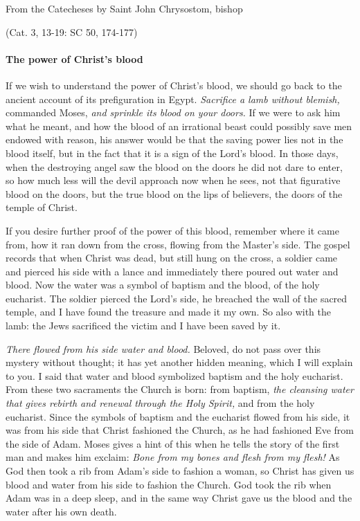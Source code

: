 From the Catecheses by Saint John Chrysostom, bishop

\par \hfill(Cat. 3, 13-19: SC 50, 174-177)

\paragraph{The power of Christ’s blood}

\lettrine[lines=3]{I}{}f we wish to understand the power of Christ’s blood, we should go back to the ancient account of its prefiguration in Egypt. \emph{Sacrifice a lamb without blemish,} commanded Moses, \emph{and sprinkle its blood on your doors.} If we were to ask him what he meant, and how the blood of an irrational beast could possibly save men endowed with reason, his answer would be that the saving power lies not in the blood itself, but in the fact that it is a sign of the Lord’s blood. In those days, when the destroying angel saw the blood on the doors he did not dare to enter, so how much less will the devil approach now when he sees, not that figurative blood on the doors, but the true blood on the lips of believers, the doors of the temple of Christ.

If you desire further proof of the power of this blood, remember where it came from, how it ran down from the cross, flowing from the Master’s side. The gospel records that when Christ was dead, but still hung on the cross, a soldier came and pierced his side with a lance and immediately there poured out water and blood. Now the water was a symbol of baptism and the blood, of the holy eucharist. The soldier pierced the Lord’s side, he breached the wall of the sacred temple, and I have found the treasure and made it my own. So also with the lamb: the Jews sacrificed the victim and I have been saved by it.

\emph{There flowed from his side water and blood.} Beloved, do not pass over this mystery without thought; it has yet another hidden meaning, which I will explain to you. I said that water and blood symbolized baptism and the holy eucharist. From these two sacraments the Church is born: from baptism, \emph{the cleansing water that gives rebirth and renewal through the Holy Spirit,} and from the holy eucharist. Since the symbols of baptism and the eucharist flowed from his side, it was from his side that Christ fashioned the Church, as he had fashioned Eve from the side of Adam. Moses gives a hint of this when he tells the story of the first man and makes him exclaim: \emph{Bone from my bones and flesh from my flesh!} As God then took a rib from Adam’s side to fashion a woman, so Christ has given us blood and water from his side to fashion the Church. God took the rib when Adam was in a deep sleep, and in the same way Christ gave us the blood and the water after his own death.

